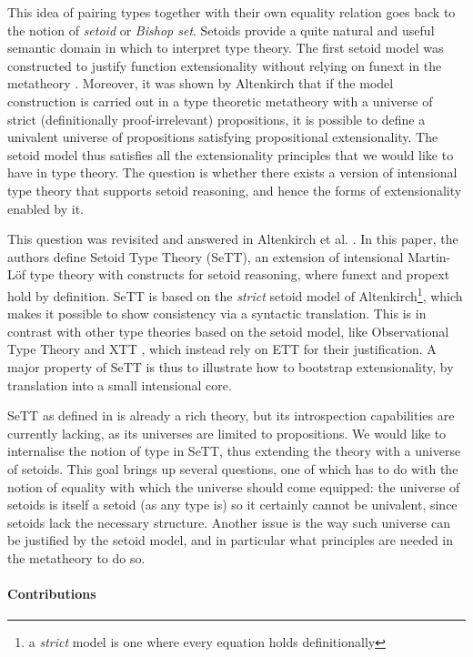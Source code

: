 \documentclass[autoref]{llncs}
\begin{document}
This idea of pairing types together with their own equality relation goes back
to the notion of \emph{setoid} or \emph{Bishop set}. Setoids provide a quite
natural and useful semantic domain in which to interpret type theory. The first
setoid model was constructed to justify function extensionality without relying
on funext in the metatheory \cite{hofmann}. Moreover, it was shown by Altenkirch
\cite{setoid99} that if the model construction is carried out in a type
theoretic metatheory with a universe of strict (definitionally proof-irrelevant)
propositions, it is possible to define a univalent universe of propositions
satisfying propositional extensionality. The setoid model thus satisfies all the
extensionality principles that we would like to have in type theory. The
question is whether there exists a version of intensional type theory that
supports setoid reasoning, and hence the forms of extensionality enabled by it.

This question was revisited and answered in Altenkirch et al. \cite{mpc19}. In
this paper, the authors define Setoid Type Theory (SeTT), an extension of
intensional Martin-L\"of type theory with constructs for setoid reasoning, where
funext and propext hold by definition. SeTT is based on the \emph{strict} setoid
model of Altenkirch\footnote{a \emph{strict} model is one where every equation
  holds definitionally}, which makes it possible to show consistency via a
syntactic translation. This is in contrast with other type theories based on the
setoid model, like Observational Type Theory \cite{alti:ott-conf,alti:ott-conf}
and XTT \cite{xtt}, which instead rely on ETT for their justification. A major
property of SeTT is thus to illustrate how to bootstrap extensionality, by
translation into a small intensional core.

SeTT as defined in \cite{mpc19} is already a rich theory, but its introspection
capabilities are currently lacking, as its universes are limited to
propositions. We would like to internalise the notion of type in SeTT, thus
extending the theory with a universe of setoids.
%
This goal brings up several questions, one of which has to do with the notion of
equality with which the universe should come equipped: the universe of setoids
is itself a setoid (as any type is) so it certainly cannot be univalent, since
setoids lack the necessary structure.
%
Another issue is the way such universe can be justified by the setoid model, and
in particular what principles are needed in the metatheory to do so.

\paragraph*{Contributions}
\end{document}
